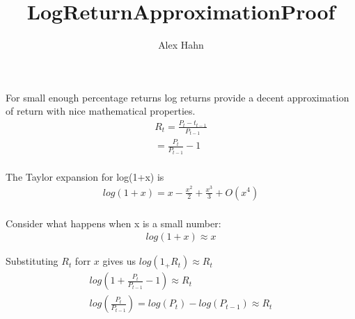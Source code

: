 \documentclass{article}
\title{LogReturnApproximationProof}
\author{Alex Hahn}
\begin{document}
\maketitle

For small enough percentage returns log returns provide a decent approximation of return with nice mathematical properties.
\begin{align}
  R_t = \frac{P_t - t_{t-1}}{P_{t-1}} \nonumber\\
  =\frac{P_t}{P_{t-1}} - 1 \nonumber\\
\end{align}

The Taylor expansion for log(1+x) is
\begin{align}
  log(1+x) = x - \frac{x^2}{2} + \frac{x^3}{3} + O(x^4) \nonumber\\
\end{align}

Consider what happens when x is a small number:
\begin{align}
  log(1+x) \approx x
\end{align}

Substituting $R_t$ forr $x$ gives us $log(1_+R_t) \approx R_t$
\begin{align}
  log\left(1+\frac{P_t}{P_{t-1}}-1\right) \approx R_t \nonumber\\
  log\left(\frac{P_t}{P_{t-1}}\right) = log(P_t)- log(P_{t-1})\approx R_t \nonumber\\
\end{align}
\end{document}

